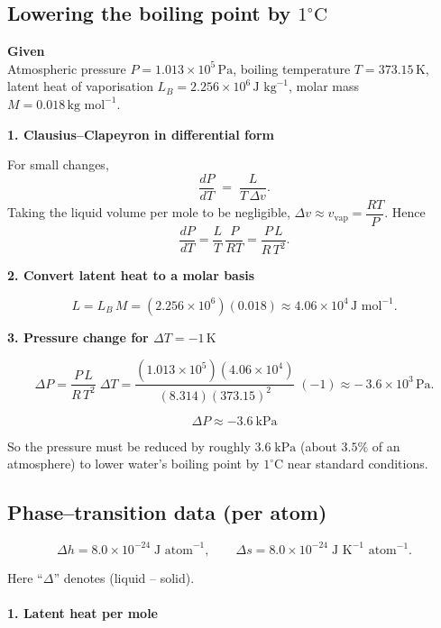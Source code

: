 \documentclass[12pt]{article}
\theoremstyle{definition} %
\theoremstyle{plain} %
\begin{document}
\subsection*{Lowering the boiling point by \(1^{\circ}\text{C}\)}

\textbf{Given}\\
Atmospheric pressure \(P = 1.013\times10^{5}\,\text{Pa}\),  
boiling temperature \(T = 373.15\,\text{K}\),  
latent heat of vaporisation \(L_B = 2.256\times10^{6}\,\text{J kg}^{-1}\),  
molar mass \(M = 0.018\,\text{kg mol}^{-1}\).

\medskip
\textbf{1.  Clausius–Clapeyron in differential form}

For small changes,
\[
  \frac{dP}{dT} \;=\; \frac{L}{T\,\Delta v}.
\]
Taking the liquid volume per mole to be negligible,  
\(\Delta v \approx v_{\text{vap}} = \dfrac{RT}{P}\).  
Hence
\[
  \frac{dP}{dT}
  = \frac{L}{T}\,\frac{P}{RT}
  = \frac{P\,L}{R\,T^{2}}.
\]

\medskip
\textbf{2.  Convert latent heat to a molar basis}

\[
  L = L_B\,M
    = (2.256\times10^{6})(0.018)
    \approx 4.06\times10^{4}\,\text{J mol}^{-1}.
\]

\medskip
\textbf{3.  Pressure change for \(\Delta T = -1\,\text{K}\)}

\[
  \Delta P
  = \frac{P\,L}{R\,T^{2}}\;\Delta T
  = \frac{(1.013\times10^{5})(4.06\times10^{4})}
         {(8.314)(373.15)^{2}}\;(-1)
  \approx -\,3.6\times10^{3}\,\text{Pa}.
\]

\[
  \boxed{\;\Delta P \approx -3.6\ \text{kPa}\;}
\]

\noindent
So the pressure must be reduced by roughly \(3.6\;\text{kPa}\) (about \(3.5\%\) of an atmosphere) to lower water’s boiling point by \(1^{\circ}\text{C}\) near standard conditions.
\subsection*{Phase–transition data (per atom)}

\[
  \Delta h = 8.0\times 10^{-24}\;\text{J atom}^{-1},\qquad
  \Delta s = 8.0\times 10^{-24}\;\text{J K}^{-1}\!\text{ atom}^{-1}.
\]

Here “$\Delta$” denotes (liquid – solid).

\paragraph{1.  Latent heat per mole}
\end{document}
